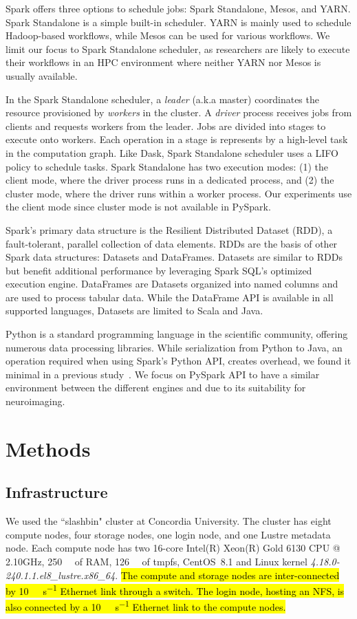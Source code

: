 \documentclass[AMA,STIX1COL]{WileyNJD-v2}
\newcommand{\HL}[1]{\hl{#1}}
\begin{document}
Spark offers three options to schedule jobs: Spark Standalone, Mesos, and YARN.
Spark Standalone is a simple built-in scheduler.
YARN is mainly used to schedule Hadoop-based workflows, while Mesos can be used for various workflows.
We limit our focus to Spark Standalone scheduler, as researchers are likely to 
execute their workflows in an HPC environment where neither YARN nor Mesos is usually available.
		
In the Spark Standalone scheduler, a \textit{leader} (a.k.a master) coordinates the resource provisioned by \textit{workers} in the cluster.
A \textit{driver}  process receives jobs from clients and requests workers from the leader.
Jobs are divided into stages to execute onto workers.
Each operation in a stage is represents by a high-level task in the computation graph.
Like Dask, Spark Standalone scheduler uses a LIFO policy to schedule tasks.
Spark Standalone has two execution modes: (1) the client mode, where the driver process runs in a dedicated process,
and (2) the cluster mode, where the driver runs within a worker process.
Our experiments use the client mode since cluster mode is not available in PySpark.
		
Spark's primary data structure is the Resilient Distributed Dataset (RDD)\cite{RDD}, a fault-tolerant, parallel collection of data elements.
RDDs are the basis of other Spark data structures: Datasets and DataFrames.
Datasets are similar to RDDs but benefit additional performance by leveraging Spark SQL's optimized execution engine. 
DataFrames are Datasets organized into named columns and are used to process tabular data. 
While the DataFrame API is available in all supported languages, Datasets are limited to Scala and Java. 
		
Python is a standard programming language in the scientific community, offering numerous data processing libraries.
While serialization from Python to Java, an operation required when using Spark's Python API, creates overhead, we found it minimal in a previous study~\cite{8943502}.
We focus on PySpark API to have a similar environment between the different engines and due to its suitability for neuroimaging.
		
\section{Methods}
\subsection{Infrastructure}
We used the ``slashbin" cluster at Concordia University.
The cluster has eight compute nodes, four storage nodes, one login node, and one Lustre metadata node.
Each compute node has two 16-core Intel(R) Xeon(R) Gold 6130 CPU @ 2.10GHz,
\SI{250}{\gibi\byte} of RAM, \SI{126}{\gibi\byte} of tmpfs,
CentOS~8.1 and Linux kernel \textit{4.18.0-240.1.1.el8\_lustre.x86\_64}.
\HL{The compute and storage nodes are inter-connected by {\SI{10}{\giga\bit\per\second}} Ethernet link through a switch.
	The login node, hosting an NFS, is also connected by a {\SI{10}{\giga\bit\per\second}} Ethernet link to the compute nodes.}
		
\end{document}
